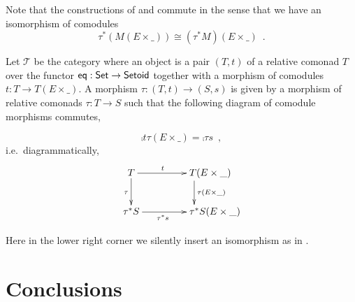 \documentclass{amsart}
\begin{document}
\begin{remark}\label{rem:prod_pullback_commute}
 Note that the constructions of  and  commute in the sense that
 we have an isomorphism of comodules \[\tau^*(M(E\times \_)) \cong (\tau^*M)(E \times \_) \enspace . \]
\end{remark}



\begin{example}\label{ex:final_sem_tri}
   Let $\mathcal{T}$ be the category where an object is a pair $(T,t)$ of a relative comonad $T$ over the functor
   $\mathsf{eq}: \mathsf{Set} \to \mathsf{Setoid}$ together with a morphism of comodules $t : T \to T(E \times \_)$.
   A morphism $\tau : (T,t) \to (S,s)$ is given by a morphism of relative comonads $\tau : T \to S$ such that
   the following diagram of comodule morphisms commutes,
   
   \[     \comp{t}{\tau(E\times \_)} = \comp{\tau}{s} \enspace , \]
   i.e.\, diagrammatically,   
   \[ \begin{xy}
       \xymatrix{   T  \ar[r]^t \ar[d]_{\tau}  &  **[r]T (E\times \_ )\ar[d]^{\tau(E\times \_)} \\
                    \tau^*S  \ar[r]_{\tau^*s}  &  **[r] \tau^*S (E\times \_ )
        }
      \end{xy}
   \]

   \noindent
   Here in the lower right corner we silently insert an isomorphism as in .
   
\end{example}

\section{Conclusions}

\printbibliography
\end{document}
